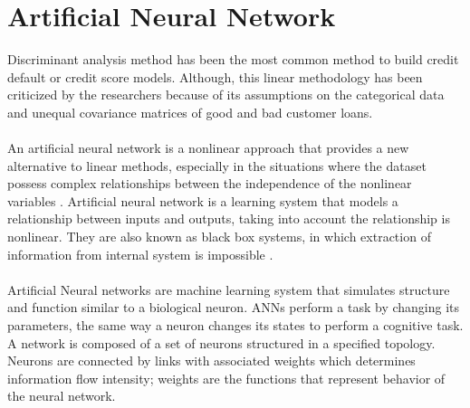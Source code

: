 \documentclass{article}[]
\begin{document}
\section{Artificial Neural Network}
Discriminant analysis method has been the most common method to build credit default or credit score models. Although, this linear methodology has been criticized by the researchers because of its assumptions on the categorical data and unequal covariance matrices of good and bad customer loans.\\\\
An artificial neural network \cite{hornik1989multilayer}\cite{bebis1994feed} is a nonlinear approach that provides a new alternative to linear methods, especially in the situations where the dataset possess complex relationships between the independence of the nonlinear variables \cite{atiya2001bankruptcy} \cite{pang2002credit}. Artificial neural network is a learning system that models a relationship between inputs and outputs, taking into account the relationship is nonlinear. They are also known as black box systems, in which extraction of information from internal system is impossible \cite{angelini2008neural}.\\\\
Artificial Neural networks are machine learning system that simulates structure and function similar to a biological neuron. ANNs perform a task by changing its parameters, the same way a neuron changes its states to perform a cognitive task. A network is composed of a set of neurons structured in a specified topology. Neurons are connected by links with associated weights which determines information flow intensity; weights are the functions that represent behavior of the neural network.\\\\
\end{document}
